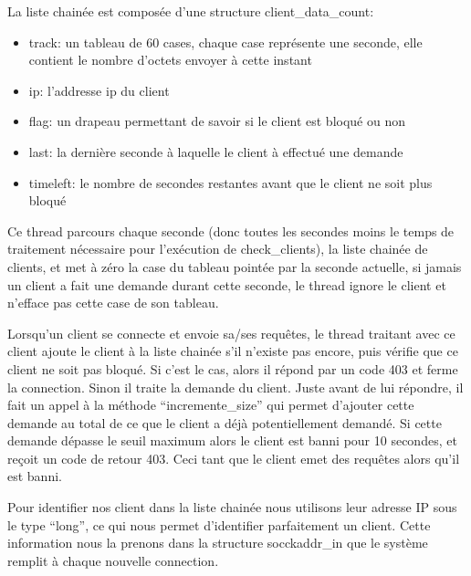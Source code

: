 \documentclass{article}
\begin{document}
La liste chainée est composée d'une structure client\_data\_count:
\begin{itemize}
\item track: un tableau de 60 cases, chaque case représente une seconde, elle contient le nombre d'octets envoyer à cette instant
\item ip: l'addresse ip du client
\item flag: un drapeau permettant de savoir si le client est bloqué ou non
\item last: la dernière seconde à laquelle le client à effectué une demande
\item timeleft: le nombre de secondes restantes avant que le client ne soit plus bloqué
\end{itemize}

Ce thread parcours chaque seconde (donc toutes les secondes moins le temps de traitement nécessaire pour l'exécution de check\_clients), la liste chainée de clients, et met à zéro la case du tableau pointée par la seconde actuelle, si jamais un client a fait une demande durant cette seconde, le thread ignore le client et n'efface pas cette case de son tableau.\hbox{}

Lorsqu'un client se connecte et envoie sa/ses requêtes, le thread traitant avec ce client ajoute le client à la liste chainée s'il n'existe pas encore, puis vérifie que ce client ne soit pas bloqué. Si c'est le cas, alors il répond par un code 403 et ferme la connection. Sinon il traite la demande du client. Juste avant de lui répondre, il fait un appel à la méthode ``incremente\_size'' qui permet d'ajouter cette demande au total de ce que le client a déjà potentiellement demandé. Si cette demande dépasse le seuil maximum alors le client est banni pour 10 secondes, et reçoit un code de retour 403. Ceci tant que le client emet des requêtes alors qu'il est banni.\hbox{}

Pour identifier nos client dans la liste chainée nous utilisons leur adresse IP sous le type ``long'', ce qui nous permet d'identifier parfaitement un client. Cette information nous la prenons dans la structure socckaddr\_in que le système remplit à chaque nouvelle connection.\hbox{}
\end{document}

